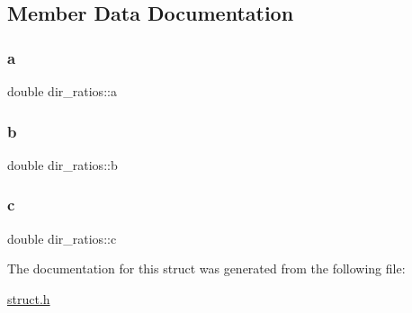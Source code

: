 \subsection{Member Data Documentation}
\mbox{\label{structdir__ratios_a8cd0b45dd30ce975c1b2d7482fba81ac}} 
\subsubsection{\texorpdfstring{a}{a}}
{\footnotesize\ttfamily double dir\+\_\+ratios\+::a}

\mbox{\label{structdir__ratios_a4e945589b5a219e39542121995e2799b}} 
\subsubsection{\texorpdfstring{b}{b}}
{\footnotesize\ttfamily double dir\+\_\+ratios\+::b}

\mbox{\label{structdir__ratios_ab8485b7011be5c94b3050fd52b1b591d}} 
\subsubsection{\texorpdfstring{c}{c}}
{\footnotesize\ttfamily double dir\+\_\+ratios\+::c}



The documentation for this struct was generated from the following file\+:\begin{DoxyCompactItemize}
\item 
\hyperlink{struct_8h}{struct.\+h}\end{DoxyCompactItemize}
